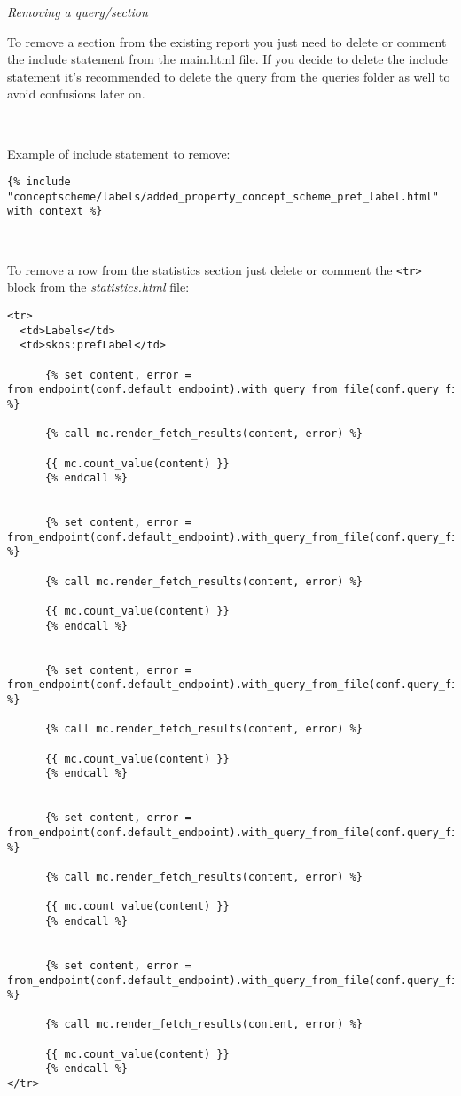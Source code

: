 \textit{Removing a query/section}

To remove a section from the existing report you just need to delete or comment the include statement from the main.html file. If you decide to delete the include statement it's recommended to delete the query from the queries folder as well to avoid confusions later on.

~
~

Example of include statement to remove:
\begin{lstlisting}
{% include "conceptscheme/labels/added_property_concept_scheme_pref_label.html" with context %}
\end{lstlisting}

~

To remove a row from the statistics section just delete or comment the \texttt{<tr>} block from the \textit{statistics.html} file:
\begin{lstlisting}
<tr>
  <td>Labels</td>
  <td>skos:prefLabel</td>
  
      {% set content, error = from_endpoint(conf.default_endpoint).with_query_from_file(conf.query_files["count_added_property_concept_scheme_pref_label.rq"]).fetch_tabular() %}
      
      {% call mc.render_fetch_results(content, error) %}

      {{ mc.count_value(content) }}
      {% endcall %}
      
  
      {% set content, error = from_endpoint(conf.default_endpoint).with_query_from_file(conf.query_files["count_deleted_property_concept_scheme_pref_label.rq"]).fetch_tabular() %}
      
      {% call mc.render_fetch_results(content, error) %}

      {{ mc.count_value(content) }}
      {% endcall %}
      
  
      {% set content, error = from_endpoint(conf.default_endpoint).with_query_from_file(conf.query_files["count_updated_property_concept_scheme_pref_label.rq"]).fetch_tabular() %}
      
      {% call mc.render_fetch_results(content, error) %}

      {{ mc.count_value(content) }}
      {% endcall %}
      
  
      {% set content, error = from_endpoint(conf.default_endpoint).with_query_from_file(conf.query_files["count_moved_property_concept_scheme_pref_label.rq"]).fetch_tabular() %}
      
      {% call mc.render_fetch_results(content, error) %}

      {{ mc.count_value(content) }}
      {% endcall %}
      
  
      {% set content, error = from_endpoint(conf.default_endpoint).with_query_from_file(conf.query_files["count_changed_property_concept_scheme_pref_label.rq"]).fetch_tabular() %}
      
      {% call mc.render_fetch_results(content, error) %}

      {{ mc.count_value(content) }}
      {% endcall %}
</tr>
\end{lstlisting}

